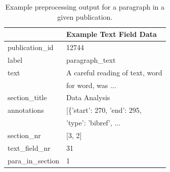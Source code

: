 \begin{table}[h]
    \centering
     \caption{Example preprocessing output for a paragraph in a given publication.}
    \begin{tabular}{ll}
        \toprule
        {}                  &                            Example Text Field Data \\
        \midrule
        publication\_id     &                                              12744 \\
        label               &                                    paragraph\_text \\
        text                &                     A careful reading of text, word\\
                            &                                  for word, was ... \\
        section\_title      &                                      Data Analysis \\
        annotations         &                        [\{'start': 270, 'end': 295,\\
                            &                              'type': 'bibref', ... \\
        section\_nr         &                                             [3, 2] \\
        text\_field\_nr     &                                                 31 \\
        para\_in\_section   &                                                  1 \\
        \bottomrule
    \end{tabular}
    \label{tab:example-paragraph}
\end{table}

